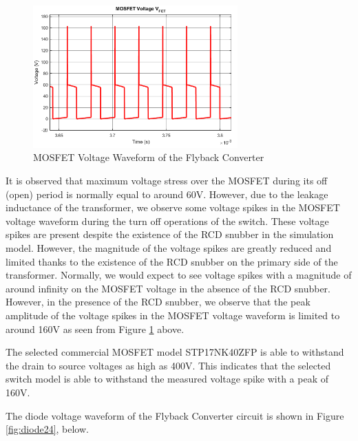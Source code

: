\begin{figure}[H]
\begin{center}
\includegraphics[width=0.7\textwidth]{figures/V_FET_24.png}
\caption{MOSFET Voltage Waveform of the Flyback Converter}
\label{fig:mos24}
\end{center}
\end{figure}

It is observed that maximum voltage stress over the MOSFET during its off (open) period is normally equal to around 60V. However, due to the leakage inductance of the transformer, we observe some voltage spikes in the MOSFET voltage waveform during the turn off operations of the switch. These voltage spikes are present despite the existence of the RCD snubber in the simulation model. However, the magnitude of the voltage spikes are greatly reduced and limited thanks to the existence of the RCD snubber on the primary side of the transformer. Normally, we would expect to see voltage spikes with a magnitude of around infinity on the MOSFET voltage in the absence of the RCD snubber. However, in the presence of the RCD snubber, we observe that the peak amplitude of the voltage spikes in the MOSFET voltage waveform is limited to around 160V as seen from Figure \ref{fig:mos24} above.

The selected commercial MOSFET model STP17NK40ZFP is able to withstand the drain to source voltages as high as 400V. This indicates that the selected switch model is able to withstand the measured voltage spike with a peak of 160V.

The diode voltage waveform of the Flyback Converter circuit is shown in Figure \ref{fig:diode24}, below.

